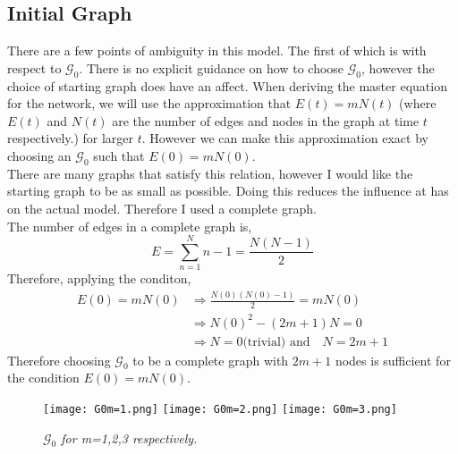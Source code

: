 \documentclass[]{article}
\begin{document}
\subsection{Initial Graph}
There are a few points of ambiguity in this model. The first of which is with respect to $\mathcal{G}_0$. There is no explicit guidance on how to choose $\mathcal{G}_0\!$, however the choice of starting graph does have an affect. When deriving the master equation for the network, we will use the approximation that $E(t)=mN(t)$ (where $E(t)$ and $N(t)$ are the number of edges and nodes in the graph at time $t$ respectively.) for larger $t$. However we can make this approximation exact by choosing an $\mathcal{G}_0$ such that $E(0)=mN(0)$.\\
There are many graphs that satisfy this relation, however I would like the starting graph to be as small as possible. Doing this reduces the influence at has on the actual model. Therefore I used a complete graph. \\
The number of edges in a complete graph is,
\begin{equation}
E=\sum_{n=1}^{N} n-1 = \frac{N(N-1)}{2}
\end{equation}
Therefore, applying the conditon, 
\begin{align}
E(0)=mN(0) &\Rightarrow \frac{N(0)(N(0)-1)}{2}=mN(0)\\
&\Rightarrow N(0)^2 - (2m +1)N = 0\\
&\Rightarrow N=0  \text{(trivial)   and} \quad N=2m+1
\end{align}
Therefore choosing $\mathcal{G}_0$ to be a complete graph with $2m+1$ nodes is sufficient for the condition $E(0)=mN(0)$.
\begin{figure}[htp]
	\centering
	
	\texttt{[image: G0m=1.png]}\hfill
	\texttt{[image: G0m=2.png]}\hfill
	\texttt{[image: G0m=3.png]}
	\caption{\textit{$\mathcal{G}_0$ for m=1,2,3 respectively.}}
\end{figure}
\end{document}
